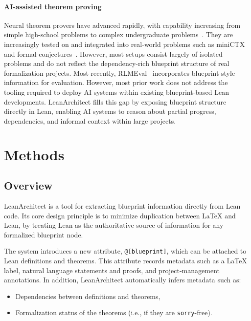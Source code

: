 \documentclass{article}
\newcommand{\leanarchitect}{LeanArchitect\xspace}
\newcommand\leancode{\lstinline[language=lean]}
\begin{document}
\paragraph{AI-assisted theorem proving}
Neural theorem provers have advanced rapidly, with capability increasing from simple high-school problems to complex undergraduate problems~\cite{zheng2021minif2f, yang2023leandojo, xin2024deepseek, xin2024deepseek1.5, ren2025deepseek, lin2025goedel, lin2025goedel2, wang2025kimina, chen2025seed, chen2025seed1.5, achim2025aristotle, hubert2025olympiad}. They are increasingly tested on and integrated into real-world problems such as miniCTX~\cite{hu2024minictx} and formal-conjectures~\cite{deepmind_formalconjectures}. However, most setups consist largely of isolated problems and do not reflect the dependency-rich blueprint structure of real formalization projects. Most recently, RLMEval~\cite{poiroux2025rlmeval} incorporates blueprint-style information for evaluation. However, most prior work does not address the tooling required to deploy AI systems within existing blueprint-based Lean developments. \leanarchitect fills this gap by exposing blueprint structure directly in Lean, enabling AI systems to reason about partial progress, dependencies, and informal context within large projects.

\section{Methods}

\subsection{Overview}

\leanarchitect is a tool for extracting blueprint information directly from Lean code. Its core design principle is to minimize duplication between \LaTeX{} and Lean, by treating Lean as the authoritative source of information for any formalized blueprint node.

The system introduces a new attribute, \leancode{@[blueprint]}, which can be attached to Lean definitions and theorems. This attribute records metadata such as a \LaTeX{} label, natural language statements and proofs, and project-management annotations. In addition, \leanarchitect automatically infers metadata such as:
\begin{samepage}
\begin{itemize}
\item Dependencies between definitions and theorems,
\item Formalization status of the theorems (i.e., if they are \leancode{sorry}-free).
\end{itemize}
\end{samepage}
\end{document}
